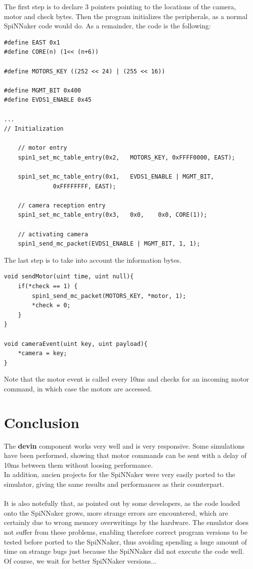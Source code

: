 \documentclass{article}
\begin{document}
The first step is to declare 3 pointers pointing to the locations of the camera, motor and check bytes. Then the program initializes the peripherals, as a normal SpiNNaker code would do. As a remainder, the code is the following:
\begin{verbatim}
#define EAST 0x1
#define CORE(n) (1<< (n+6))

#define MOTORS_KEY ((252 << 24) | (255 << 16))

#define MGMT_BIT 0x400
#define EVDS1_ENABLE 0x45

...
// Initialization

	// motor entry
	spin1_set_mc_table_entry(0x2, 	MOTORS_KEY, 0xFFFF0000,	EAST);

	spin1_set_mc_table_entry(0x1, 	EVDS1_ENABLE | MGMT_BIT, 
              0xFFFFFFFF, EAST);

	// camera reception entry
	spin1_set_mc_table_entry(0x3, 	0x0,	0x0, CORE(1));

	// activating camera
	spin1_send_mc_packet(EVDS1_ENABLE | MGMT_BIT, 1, 1);
\end{verbatim}

The last step is to take into account the information bytes.
\begin{verbatim}
void sendMotor(uint time, uint null){
    if(*check == 1) {
        spin1_send_mc_packet(MOTORS_KEY, *motor, 1);
        *check = 0;
    }
}

void cameraEvent(uint key, uint payload){
    *camera = key;
}
\end{verbatim}
Note that the motor event is called every 10ms and checks for an incoming motor command, in which case the motors are accessed.

\section{Conclusion}
The \textbf{devin} component works very well and is very responsive. Some simulations have been performed, showing that motor commands can be sent with a delay of 10ms between them without loosing performance.\\
In addition, ancien projects for the SpiNNaker were very easily ported to the simulator, giving the same results and performances as their counterpart.\\
\\
It is also notefully that, as pointed out by some developers, as the code loaded onto the SpiNNaker grows, more strange errors are encountered, which are certainly due to wrong memory overwritings by the hardware. The emulator does not suffer from these problems, enabling therefore correct program versions to be tested before ported to the SpiNNaker, thus avoiding spending a huge amount of time on strange bugs just because the SpiNNaker did not execute the code well. Of course, we wait for better SpiNNaker versions... 
\end{document}
